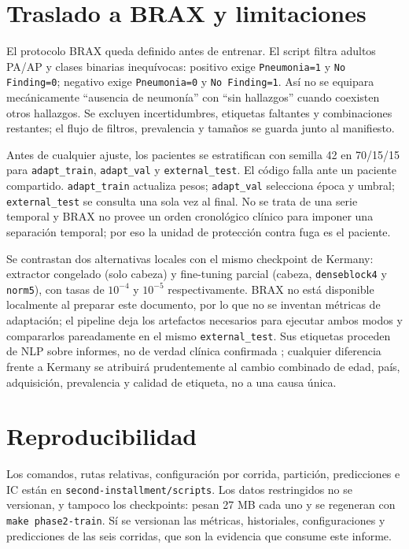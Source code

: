 \documentclass[11pt]{article}
\begin{document}
\section{Traslado a BRAX y limitaciones}
El protocolo BRAX queda definido antes de entrenar. El script filtra adultos PA/AP y clases binarias inequívocas: positivo exige \texttt{Pneumonia=1} y \texttt{No Finding=0}; negativo exige \texttt{Pneumonia=0} y \texttt{No Finding=1}. Así no se equipara mecánicamente ``ausencia de neumonía'' con ``sin hallazgos'' cuando coexisten otros hallazgos. Se excluyen incertidumbres, etiquetas faltantes y combinaciones restantes; el flujo de filtros, prevalencia y tamaños se guarda junto al manifiesto.

Antes de cualquier ajuste, los pacientes se estratifican con semilla 42 en 70/15/15 para \texttt{adapt\_train}, \texttt{adapt\_val} y \texttt{external\_test}. El código falla ante un paciente compartido. \texttt{adapt\_train} actualiza pesos; \texttt{adapt\_val} selecciona época y umbral; \texttt{external\_test} se consulta una sola vez al final. No se trata de una serie temporal y BRAX no provee un orden cronológico clínico para imponer una separación temporal; por eso la unidad de protección contra fuga es el paciente.

Se contrastan dos alternativas locales con el mismo checkpoint de Kermany: extractor congelado (solo cabeza) y fine-tuning parcial (cabeza, \texttt{denseblock4} y \texttt{norm5}), con tasas de $10^{-4}$ y $10^{-5}$ respectivamente. BRAX no está disponible localmente al preparar este documento, por lo que no se inventan métricas de adaptación; el pipeline deja los artefactos necesarios para ejecutar ambos modos y compararlos pareadamente en el mismo \texttt{external\_test}. Sus etiquetas proceden de NLP sobre informes, no de verdad clínica confirmada \parencite{reis2022a}; cualquier diferencia frente a Kermany se atribuirá prudentemente al cambio combinado de edad, país, adquisición, prevalencia y calidad de etiqueta, no a una causa única.

\section{Reproducibilidad}
Los comandos, rutas relativas, configuración por corrida, partición, predicciones e IC están en \texttt{second-installment/scripts}. Los datos restringidos no se versionan, y tampoco los checkpoints: pesan 27 MB cada uno y se regeneran con \texttt{make phase2-train}. Sí se versionan las métricas, historiales, configuraciones y predicciones de las seis corridas, que son la evidencia que consume este informe.
\end{document}

